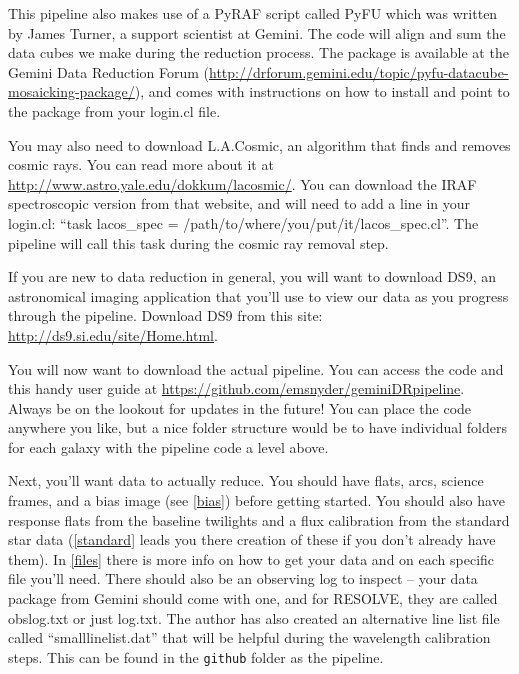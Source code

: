 \documentclass[12pt]{report}
\begin{document}
This pipeline also makes use of a PyRAF script called PyFU which was written by James Turner, a support scientist at Gemini. The code will align and sum the data cubes we make during the reduction process. The package is available at the Gemini Data Reduction Forum (\url{http://drforum.gemini.edu/topic/pyfu-datacube-mosaicking-package/}), and comes with instructions on how to install and point to the package from your login.cl file.

You may also need to download L.A.Cosmic, an algorithm that finds and removes cosmic rays. You can read more about it at \url{http://www.astro.yale.edu/dokkum/lacosmic/}. You can download the IRAF spectroscopic version from that website, and will need to add a line in your login.cl: ``task lacos\_spec = /path/to/where/you/put/it/lacos\_spec.cl''. The pipeline will call this task during the cosmic ray removal step.

If you are new to data reduction in general, you will want to download DS9, an astronomical imaging application that you'll use to view our data as you progress through the pipeline. Download DS9 from this site: \url{http://ds9.si.edu/site/Home.html}.

You will now want to download the actual pipeline. You can access the code and this handy user guide at \url{https://github.com/emsnyder/geminiDRpipeline}. Always be on the lookout for updates in the future! You can place the code anywhere you like, but a nice folder structure would be to have individual folders for each galaxy with the pipeline code a level above. 

Next, you'll want data to actually reduce. You should have flats, arcs, science frames, and a bias image (see \autoref{bias}) before getting started. You should also have response flats from the baseline twilights and a flux calibration from the standard star data (\autoref{standard} leads you there creation of these if you don't already have them). In \autoref{files} there is more info on how to get your data and on each specific file you'll need. There should also be an observing log to inspect -- your data package from Gemini should come with one, and for RESOLVE, they are called obslog.txt or just log.txt. The author has also created an alternative line list file called ``smalllinelist.dat'' that will be helpful during the wavelength calibration steps. This can be found in the \texttt{github} folder as the pipeline.
\end{document}
